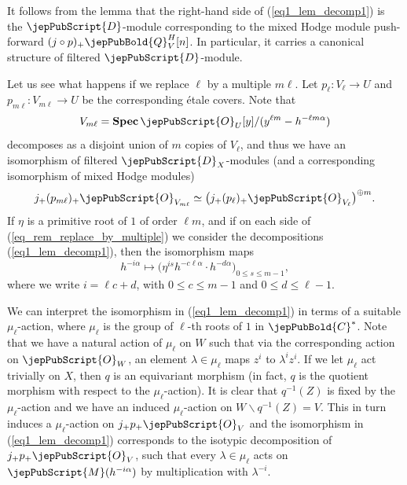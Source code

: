 It follows from the lemma that the right-hand side of (\ref{eq1_lem_decomp1}) is the $\jepPubScript{D}$-module corresponding to the 
mixed Hodge module push-forward $(j\circ p)_+\jepPubBold{Q}_V^H[n]$. In particular, it 
 carries a canonical structure of filtered $\jepPubScript{D}$-module. 


\begin{remark}\label{rem_replace_by_multiple}
Let us see what happens if we replace $\ell$ by a multiple $m\ell$. Let $p_{\ell}\colon V_{\ell}\to U$ and $p_{m\ell}\colon V_{m\ell}\to U$ be the corresponding \'{e}tale covers.
Note that $$V_{m\ell}={\bf Spec}\,\jepPubScript{O}_U[y]/(y^{\ell m}-h^{-\ell m\alpha})$$ decomposes as a disjoint union of $m$ copies of $V_{\ell}$, and thus we have an isomorphism of filtered $\jepPubScript{D}_X$-modules (and a corresponding isomorphism of mixed Hodge modules)
\begin{equation}\label{eq_rem_replace_by_multiple}
j_+(p_{m\ell})_+\jepPubScript{O}_{V_{m\ell}}\simeq 
\big(j_+(p_{\ell})_+\jepPubScript{O}_{V_{\ell}}\big)^{\oplus m}.
\end{equation}
If $\eta$ is a primitive root of $1$ of order $\ell m$, and if on each side of 
(\ref{eq_rem_replace_by_multiple}) we consider the decompositions 
(\ref{eq1_lem_decomp1}), then the isomorphism maps 
$$h^{-i\alpha} \longmapsto \big(\eta^{is}h^{-c\ell\alpha}\cdot h^{-d\alpha}\big)_{0\leqslant s\leqslant m-1},$$
where we write $i=\ell c+d$, with $0\leqslant c\leqslant m-1$ and $0\leqslant d\leqslant\ell-1$.
\end{remark}

We can interpret the isomorphism in (\ref{eq1_lem_decomp1}) in terms of a suitable $\mu_\ell$-action, where $\mu_{\ell}$
is the group of $\ell$-th roots of $1$ in $\jepPubBold{C}^*$. Note that we have a natural action of $\mu_{\ell}$ on $W$ such that
via the corresponding action on $\jepPubScript{O}_W$, an element $\lambda\in\mu_{\ell}$ maps $z^i$ to $\lambda^iz^i$. 
If we let $\mu_{\ell}$ act trivially on $X$, then $q$ is an equivariant morphism (in fact, $q$ is the quotient morphism with respect
to the $\mu_{\ell}$-action). It is clear that $q^{-1}(Z)$ is fixed by the $\mu_{\ell}$-action and we have an induced $\mu_{\ell}$-action
on $W\smallsetminus q^{-1}(Z)=V$. This in turn induces a $\mu_{\ell}$-action on $j_+p_+\jepPubScript{O}_V$ and the isomorphism in
(\ref{eq1_lem_decomp1}) corresponds to the isotypic decomposition of $j_+p_+\jepPubScript{O}_V$, such that every 
$\lambda\in\mu_{\ell}$ acts on $\jepPubScript{M}(h^{-i\alpha})$ by multiplication with $\lambda^{-i}$. 


